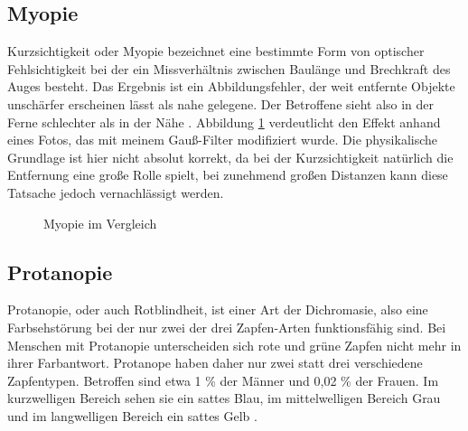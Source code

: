 \documentclass[a4paper]{article}
\begin{document}
\subsection*{Myopie}
Kurzsichtigkeit oder Myopie bezeichnet eine bestimmte Form von optischer Fehlsichtigkeit bei der ein Missverhältnis zwischen Baulänge und Brechkraft des Auges besteht. Das Ergebnis ist ein Abbildungsfehler, der weit entfernte Objekte unschärfer erscheinen lässt als nahe gelegene. Der Betroffene sieht also in der Ferne schlechter als in der Nähe \cite{WP-KS}. Abbildung \ref{myopia} verdeutlicht den Effekt anhand eines Fotos, das mit meinem Gauß-Filter \cite{WP-GF} modifiziert wurde. Die physikalische Grundlage ist hier nicht absolut korrekt, da bei der Kurzsichtigkeit natürlich die Entfernung eine große Rolle spielt, bei zunehmend großen Distanzen kann diese Tatsache jedoch vernachlässigt werden.

\begin{figure}[H]
\centering
{}
\caption{Myopie im Vergleich}
\label{myopia}
\end{figure}

\newpage

\subsection*{Protanopie}
Protanopie, oder auch Rotblindheit, ist einer Art der Dichromasie, also eine Farbsehstörung bei der nur zwei der drei Zapfen-Arten funktionsfähig sind. Bei Menschen mit Protanopie unterscheiden sich rote und grüne Zapfen nicht mehr in ihrer Farbantwort. Protanope haben daher nur zwei statt drei verschiedene Zapfentypen. Betroffen sind etwa 1 \% der Männer und 0,02 \% der Frauen. Im kurzwelligen Bereich sehen sie ein sattes Blau, im mittelwelligen Bereich Grau und im langwelligen Bereich ein sattes Gelb \cite{WP-P}.
\end{document}
